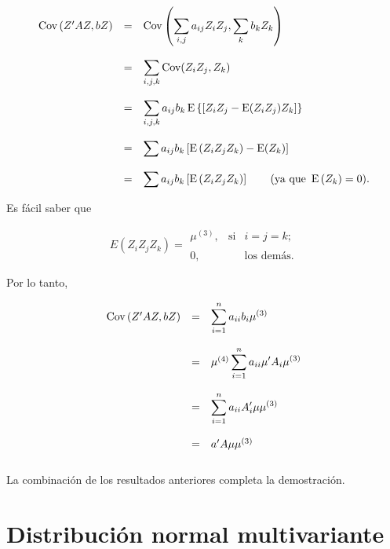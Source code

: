 \begin{teo}
    $$
    \begin{array}{rcl}
	\mathop{\mbox{\normalfont Cov}}\nolimits\left(Z'AZ,bZ\right) &=& \mathop{\mbox{\normalfont Cov}}\nolimits\left(\displaystyle\sum_{i,j}a_{ij}Z_iZ_j,\sum_k b_k Z_k\right)\\\\
				 &=& \displaystyle\sum_{i,j,k} \mathop{\mbox{\normalfont Cov}}\nolimits(Z_iZ_j,Z_k)\\\\
				 &=& \displaystyle\sum_{i,j,k} a_{ij}b_k \mathop{\mbox{\normalfont E}}\nolimits\left\{\left[Z_iZ_j-\mathop{\mbox{\normalfont E}}\nolimits(Z_iZ_j)Z_k\right]\right\}\\\\
				 &=& \displaystyle\sum a_{ij}b_k \left[\mathop{\mbox{\normalfont E}}\nolimits\left(Z_iZ_jZ_k\right)-\mathop{\mbox{\normalfont E}}\nolimits(Z_k)\right]\\\\
				 &=& \displaystyle\sum a_{ij}b_k \left[\mathop{\mbox{\normalfont E}}\nolimits\left(Z_iZ_jZ_k\right)\right]\quad \quad (\mbox{ya que }\mathop{\mbox{\normalfont E}}\nolimits\left(Z_k\right)=0).
    \end{array}
    $$

    Es fácil saber que

    $$
    E(Z_iZ_jZ_k) =
	\begin{array}{rcl}
	    \mu^{(3)}, &\text{si} & i=j=k;\\\\
	    0, & &\mbox{los demás}.
	\end{array}
    $$

    Por lo tanto,

    $$
    \begin{array}{rcl}
	\mathop{\mbox{\normalfont Cov}}\nolimits\left(Z'AZ,bZ\right) &=& \displaystyle\sum_{i=1}^n a_{ii}b_i \mu^{(3)}\\\\
				 &=& \mu^{(4)}\displaystyle\sum_{i=1}^n a_{ii}\mu'A_i \mu^{(3)}\\\\
				 &=& \displaystyle\sum_{i=1}^n a_{ii}A'_i\mu\mu^{(3)}\\\\
				 &=& a'A\mu\mu^{(3)}\\\\
    \end{array}
    $$
    La combinación de los resultados anteriores completa la demostración.
\end{teo}


\section{Distribución normal multivariante}



